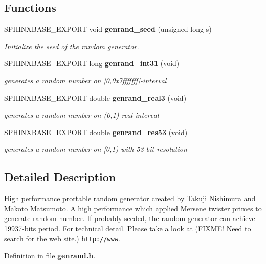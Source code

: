 \subsection*{Functions}
\begin{DoxyCompactItemize}
\item 
S\-P\-H\-I\-N\-X\-B\-A\-S\-E\-\_\-\-E\-X\-P\-O\-R\-T void {\bf genrand\-\_\-seed} (unsigned long s)\label{genrand_8h_a2881c7b606d9a2b2852e5946d71d32b7}

\begin{DoxyCompactList}\small\item\em Initialize the seed of the random generator. \end{DoxyCompactList}\item 
S\-P\-H\-I\-N\-X\-B\-A\-S\-E\-\_\-\-E\-X\-P\-O\-R\-T long {\bf genrand\-\_\-int31} (void)\label{genrand_8h_a10263695978c84103fb3526fdae21d4c}

\begin{DoxyCompactList}\small\item\em generates a random number on [0,0x7fffffff]-\/interval \end{DoxyCompactList}\item 
S\-P\-H\-I\-N\-X\-B\-A\-S\-E\-\_\-\-E\-X\-P\-O\-R\-T double {\bf genrand\-\_\-real3} (void)\label{genrand_8h_ad5fbfda1cb738d2beff277444bc71b1a}

\begin{DoxyCompactList}\small\item\em generates a random number on (0,1)-\/real-\/interval \end{DoxyCompactList}\item 
S\-P\-H\-I\-N\-X\-B\-A\-S\-E\-\_\-\-E\-X\-P\-O\-R\-T double {\bf genrand\-\_\-res53} (void)\label{genrand_8h_a2fca03c5dad1835f55e09c6e66d3b960}

\begin{DoxyCompactList}\small\item\em generates a random number on [0,1) with 53-\/bit resolution \end{DoxyCompactList}\end{DoxyCompactItemize}


\subsection{Detailed Description}
High performance prortable random generator created by Takuji Nishimura and Makoto Matsumoto. A high performance which applied Mersene twister primes to generate random number. If probably seeded, the random generator can achieve 19937-\/bits period. For technical detail. Please take a look at (F\-I\-X\-M\-E! Need to search for the web site.) {\tt http\-://www}. 

Definition in file {\bf genrand.\-h}.

